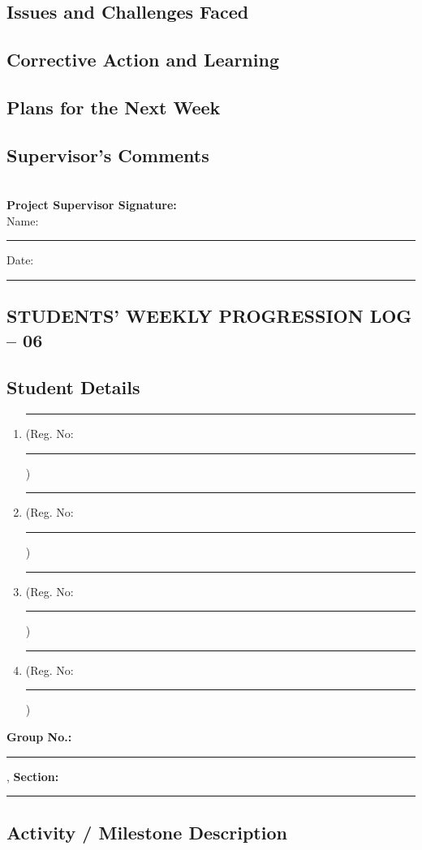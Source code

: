 \documentclass[a4paper]{article}
\begin{document}
\subsection*{Issues and Challenges Faced}
\framebox[\textwidth][c]{\rule{0pt}{4cm}}


\subsection*{Corrective Action and Learning}
\framebox[\textwidth][c]{\rule{0pt}{4cm}}


\subsection*{Plans for the Next Week}
\framebox[\textwidth][c]{\rule{0pt}{4cm}}

\subsection*{Supervisor's Comments}
\framebox[\textwidth][c]{\rule{0pt}{4cm}}\\[2em]

\vfill
\textbf{Project Supervisor Signature:}\\[1em]
Name: \rule{6cm}{0.4pt} \hfill Date: \rule{4cm}{0.4pt}


\newpage
\begin{center}
\section*{STUDENTS' WEEKLY PROGRESSION LOG -- 06}
\end{center}
\subsection*{Student Details}
\begin{enumerate}[itemsep=0em]
\item \rule{8cm}{0.4pt} (Reg. No:\rule{2cm}{0.4pt})
\item \rule{8cm}{0.4pt} (Reg. No:\rule{2cm}{0.4pt})
\item \rule{8cm}{0.4pt} (Reg. No:\rule{2cm}{0.4pt})
\item \rule{8cm}{0.4pt} (Reg. No:\rule{2cm}{0.4pt})
\end{enumerate}
\textbf{Group No.:} \rule{4cm}{0.4pt}, \textbf{Section:} \rule{3.5cm}{0.4pt}

				 

\subsection*{Activity / Milestone Description}
\framebox[\textwidth][c]{\rule{0pt}{4cm}}
\end{document}
